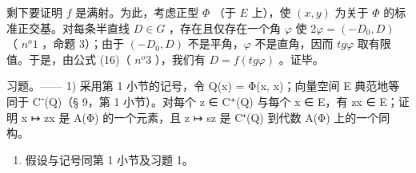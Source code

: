 剩下要证明 \(f\) 是满射。为此，考虑正型 \(\Phi\) （于 \(E\) 上），使 \((x, y)\) 为关于 \(\Phi\) 的标准正交基。对每条半直线 \(D \in G\) ，存在且仅存在一个角 \(\varphi\) 使 \(2\varphi = (-D_0, D)\) （ \(n^o 1\) ，命题 3）；由于 \((-D_0, D)\) 不是平角，\(\varphi\) 不是直角，因而 \(tg\varphi\) 取有限值。于是，由公式 (16)（ \(n^o 3\) ），我们有 \(D = f(tg\varphi)\) 。证毕。

习题。—— 1) 采用第 1 小节的记号，令 Q(x) = Φ(x, x)；向量空间 E 典范地等同于 C⁻(Q)（§ 9，第 1 小节）。对每个 z ∈ C⁺(Q) 与每个 x ∈ E，有 zx ∈ E；证明 x ↦ zx 是 A(Φ) 的一个元素，且 z ↦ sz 是 C⁺(Q) 到代数 A(Φ) 上的一个同构。

\begin{enumerate}
\def\labelenumi{\arabic{enumi})}
\setcounter{enumi}{1}
\tightlist
\item
  假设与记号同第 1 小节及习题 1。
\end{enumerate}

